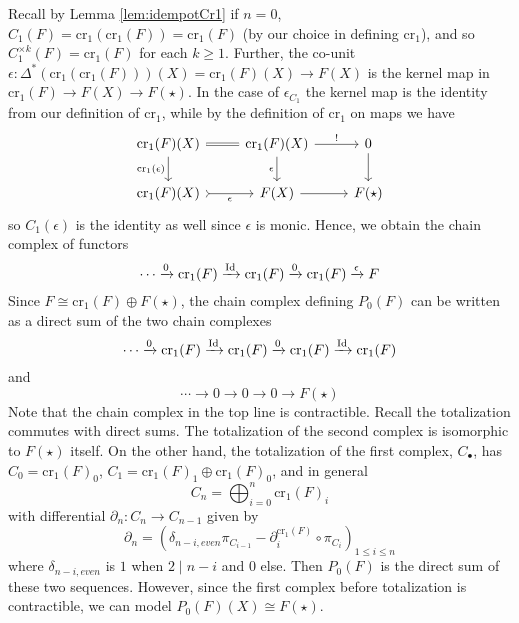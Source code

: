 Recall by Lemma \ref{lem:idempotCr1} if $n = 0$, $C_1(F) = \text{cr}_1(\text{cr}_1(F))=\text{cr}_1(F)$ (by our choice in defining $\text{cr}_1$), and so $C_1^{\times k}(F) = \text{cr}_1(F)$ for each $k \geq 1$. Further, the co-unit $\epsilon:\Delta^*(\text{cr}_1(\text{cr}_1(F)))(X) = \text{cr}_1(F)(X)\rightarrow F(X)$ is the kernel map in $\text{cr}_1(F)\rightarrow F(X)\rightarrow F(\star)$. In the case of $\epsilon_{C_1}$ the kernel map is the identity from our definition of $\text{cr}_1$, while by the definition of $\text{cr}_1$ on maps we have
\[\begin{tikzcd}
	{\text{cr}_1(F)(X)} & {\text{cr}_1(F)(X)} & 0 \\
	{\text{cr}_1(F)(X)} & {F(X)} & {F(\star)}
	\arrow[Rightarrow, no head, from=1-1, to=1-2]
	\arrow["{!}", from=1-2, to=1-3]
	\arrow["{\text{cr}_1(\epsilon)}"', from=1-1, to=2-1]
	\arrow["\epsilon"', from=1-2, to=2-2]
	\arrow[from=2-2, to=2-3]
	\arrow[from=1-3, to=2-3]
	\arrow["\epsilon"', tail, from=2-1, to=2-2]
\end{tikzcd}\]
so $C_1(\epsilon)$ is the identity as well since $\epsilon$ is monic. Hence, we obtain the chain complex of functors
\begin{equation*}
    \cdots \xrightarrow{0}\text{cr}_1(F)\xrightarrow{\operatorname{Id}}\text{cr}_1(F)\xrightarrow{0}\text{cr}_1(F)\xrightarrow{\epsilon}F
\end{equation*}
Since $F \cong \text{cr}_1(F)\oplus F(\star)$, the chain complex defining $P_0(F)$ can be written as a direct sum of the two chain complexes
\begin{equation*}
    \cdots \xrightarrow{0}\text{cr}_1(F)\xrightarrow{\operatorname{Id}}\text{cr}_1(F)\xrightarrow{0}\text{cr}_1(F)\xrightarrow{\operatorname{Id}}\text{cr}_1(F)
\end{equation*}
and
\begin{equation*}
    \cdots\rightarrow 0\rightarrow 0 \rightarrow 0 \rightarrow F(\star)
\end{equation*}
Note that the chain complex in the top line is contractible. Recall the totalization commutes with direct sums. The totalization of the second complex is isomorphic to $F(\star)$ itself. On the other hand, the totalization of the first complex, $C_\bullet$, has $C_0 = \text{cr}_1(F)_0$, $C_1 = \text{cr}_1(F)_1\oplus \text{cr}_1(F)_0$, and in general
\begin{equation*}
    C_n = \bigoplus_{i=0}^n\text{cr}_1(F)_i
\end{equation*}
with differential $\partial_n:C_n\rightarrow C_{n-1}$ given by 
\begin{equation*}
    \partial_n = (\delta_{n-i,even}\pi_{C_{i-1}}-\partial_i^{\text{cr}_1(F)}\circ \pi_{C_i})_{1\leq i \leq n}
\end{equation*}
where $\delta_{n-i,even}$ is $1$ when $2\mid n-i$ and $0$ else. Then $P_0(F)$ is the direct sum of these two sequences. However, since the first complex before totalization is contractible, we can model $P_0(F)(X) \cong F(\star)$.

